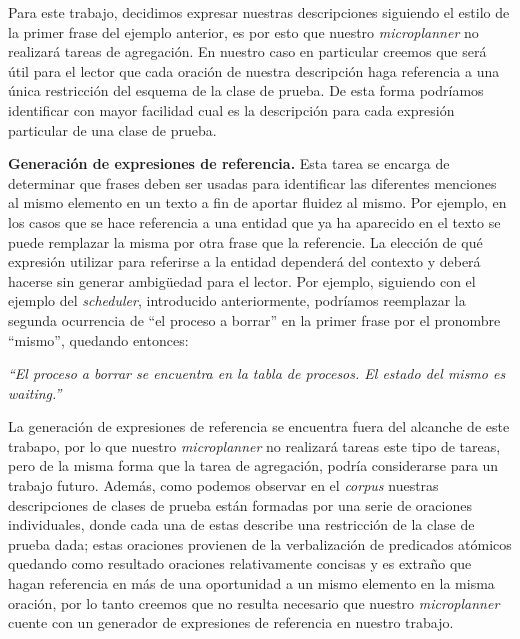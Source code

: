 \medskip
\noindent
Para este trabajo, decidimos expresar nuestras descripciones siguiendo el estilo de la primer frase del ejemplo anterior, es por esto que nuestro \textit{microplanner} no realizará tareas de agregación. En nuestro caso en particular creemos que será útil para el lector que cada oración de nuestra descripción haga referencia a una única restricción del esquema de la clase de prueba. De esta forma podríamos identificar con mayor facilidad cual es la descripción para cada expresión particular de una clase de prueba.


\medskip
\noindent
\textbf{Generación de expresiones de referencia.} Esta tarea se encarga de determinar que frases deben ser usadas para identificar las diferentes menciones al mismo elemento en un texto a fin de aportar fluidez al mismo. Por ejemplo, en los casos que se hace referencia a una entidad que ya ha aparecido en el texto se puede remplazar la misma por otra frase que la referencie. La elección de qué expresión utilizar para referirse a la entidad dependerá del contexto y deberá hacerse sin generar ambigüedad para el lector. Por ejemplo, siguiendo con el ejemplo del \emph{scheduler}, introducido anteriormente, podríamos reemplazar la segunda ocurrencia de ``el proceso a borrar'' en la primer frase por el pronombre ``mismo'', quedando entonces:

\smallskip
\begin{center}
\emph{``El proceso a borrar se encuentra en la tabla de procesos. El estado del mismo es waiting.''} 
\end{center}

\smallskip
La generación de expresiones de referencia se encuentra fuera del alcanche de este trabapo, por lo que nuestro \textit{microplanner} no realizará tareas este tipo de tareas, pero de la misma forma que la tarea de agregación, podría considerarse para un trabajo futuro. Además, como podemos observar en el \emph{corpus} nuestras descripciones de clases de prueba están formadas por una serie de oraciones individuales, donde cada una de estas describe una restricción de la clase de prueba dada; estas oraciones provienen de la verbalización de predicados atómicos quedando como resultado oraciones relativamente concisas y es extraño que hagan referencia en más de una oportunidad a un mismo elemento en la misma oración, por lo tanto creemos que no resulta necesario que nuestro \textit{microplanner} cuente con un generador de expresiones de referencia en nuestro trabajo.



